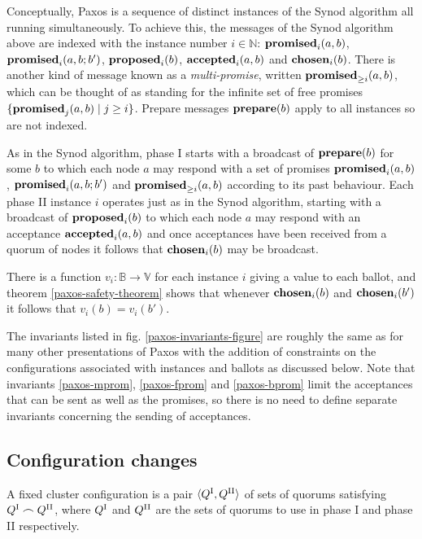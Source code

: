 \documentclass[journal]{IEEEtran}
\begin{document}
Conceptually, Paxos is a sequence of distinct instances of the Synod algorithm
all running simultaneously. To achieve this, the messages of the Synod
algorithm above are indexed with the instance number $i \in \mathbb N$:
$\mathbf{promised}_{i}(a,b)$, $\mathbf{promised}_{i}(a,b;b')$, $\mathbf{proposed}_{i}(b)$, $\mathbf{accepted}_{i}(a,b)$ and
$\mathbf{chosen}_{i}(b)$.  There is another kind of message known as a
\textit{multi-promise}, written $\mathbf{promised}_{\ge i}(a,b)$, which can be thought of as
standing for the infinite set of free promises ${\{ \mathbf{promised}_{j}(a,b) \mid j \ge
i \}}$. Prepare messages $\mathbf{prepare}(b)$ apply to all instances so are not indexed.

As in the Synod algorithm, phase I starts with a broadcast of $\mathbf{prepare}(b)$ for
some $b$ to which each node $a$ may respond with a set of promises
$\mathbf{promised}_{i}(a,b)$, $\mathbf{promised}_{i}(a,b;b')$ and $\mathbf{promised}_{\ge i}(a,b)$ according to its
past behaviour. Each phase II instance $i$ operates just as in the Synod
algorithm, starting with a broadcast of $\mathbf{proposed}_{i}(b)$ to which each node $a$
may respond with an acceptance $\mathbf{accepted}_{i}(a,b)$ and once acceptances have been
received from a quorum of nodes it follows that $\mathbf{chosen}_{i}(b)$ may be
broadcast.

There is a function $v_i : \mathbb B \to \mathbb V$ for each instance $i$
giving a value to each ballot, and theorem \ref{paxos-safety-theorem} shows
that whenever $\mathbf{chosen}_{i}(b)$ and $\mathbf{chosen}_{i}(b')$ it follows that $v_i(b) =
v_i(b')$.

The invariants listed in fig. \ref{paxos-invariants-figure} are roughly the
same as for many other presentations of Paxos with the addition of constraints
on the configurations associated with instances and ballots as discussed below.
Note that invariants \ref{paxos-mprom}, \ref{paxos-fprom} and \ref{paxos-bprom}
limit the acceptances that can be sent as well as the promises, so there is no
need to define separate invariants concerning the sending of acceptances.

\subsection{Configuration changes}\label{configuration-changes}

A fixed cluster configuration is a pair $\langle {Q}^\textrm{I}_{}, {Q}^\textrm{II}_{} \rangle$ of sets
of quorums satisfying ${Q}^\textrm{I}_{} \frown {Q}^\textrm{II}_{}$, where ${Q}^\textrm{I}_{}$ and ${Q}^\textrm{II}_{}$ are the
sets of quorums to use in phase I and phase II respectively.
\end{document}
